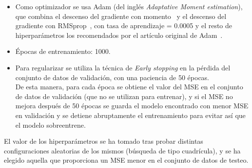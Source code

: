 \begin{itemize}
\item Como optimizador se usa Adam (del ingl\'es \textit{Adaptative Moment estimation}), que combina el descenso del gradiente con momento~\cite{PMID:12662723} y el descenso del gradiente con RMSprop~\cite{tieleman2012lecture}, con tasa de aprendizaje = 0.0005 y el resto de hiperpar\'ametros los recomendados por el art\'iculo original de Adam~\cite{Kingma2015AdamAM}.

\item \'Epocas de entrenamiento: 1000.

\item Para regularizar se utiliza la t\'ecnica de \textit{Early stopping} en la p\'erdida del conjunto de datos de validaci\'on, con una paciencia de 50 \'epocas. \\
De esta manera, para cada \'epoca se obtiene el valor del MSE en el conjunto de datos de validaci\'on (que no se utilizan para entrenar), y si el MSE no mejora despu\'es de 50 \'epocas se guarda el modelo encontrado con menor MSE en validaci\'on y se detiene abruptamente el entrenamiento para evitar as\'i que el modelo sobreentrene. 

\end{itemize}

El valor de los hiperpar\'ametros se ha tomado tras probar distintas configuraciones aleatorias de los mismos (b\'usqueda de tipo cuadr\'icula), y se ha elegido aquella que proporciona un MSE menor en el conjunto de datos de testeo.


\clearpage
